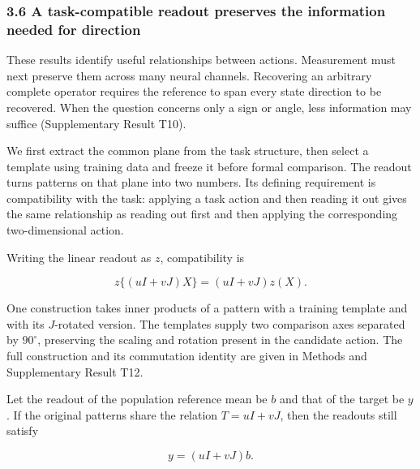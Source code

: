 \documentclass[11pt,a4paper]{article}
\begin{document}
\subsubsection{3.6 A task-compatible readout preserves the information
needed for
direction}\label{a-task-compatible-readout-preserves-the-information-needed-for-direction}

These results identify useful relationships between actions. Measurement
must next preserve them across many neural channels. Recovering an
arbitrary complete operator requires the reference to span every state
direction to be recovered. When the question concerns only a sign or
angle, less information may suffice (Supplementary Result T10).

We first extract the common plane from the task structure, then select a
template using training data and freeze it before formal comparison. The
readout turns patterns on that plane into two numbers. Its defining
requirement is compatibility with the task: applying a task action and
then reading it out gives the same relationship as reading out first and
then applying the corresponding two-dimensional action.

\par
\noindent\begin{minipage}{\linewidth}

Writing the linear readout as \(z\), compatibility is

\[
z\{(uI+vJ)X\}=(uI+vJ)z(X).
\]

\end{minipage}\par

One construction takes inner products of a pattern with a training
template and with its \(J\)-rotated version. The templates supply two
comparison axes separated by \(90^\circ\), preserving the scaling and
rotation present in the candidate action. The full construction and its
commutation identity are given in Methods and Supplementary Result T12.

\par
\noindent\begin{minipage}{\linewidth}

Let the readout of the population reference mean be \(b\) and that of
the target be \(y\). If the original patterns share the relation
\(T=uI+vJ\), then the readouts still satisfy

\[
y=(uI+vJ)b.
\]

\end{minipage}\par
\end{document}
